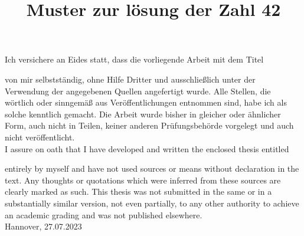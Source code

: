 \newpage
\title{Muster zur lösung der Zahl 42}
\newpage
{}%
\begin{flushleft}
Ich versichere an Eides statt, dass die vorliegende Arbeit mit dem Titel
\end{flushleft}
\begin{center}
\thetitle
\end{center}
\begin{flushleft}
von mir selbstständig, ohne Hilfe Dritter und ausschließlich unter der Verwendung der angegebenen Quellen angefertigt wurde. Alle Stellen, die wörtlich oder sinngemäß aus Veröffentlichungen entnommen sind, habe ich als solche kenntlich gemacht. Die Arbeit wurde bisher in gleicher oder ähnlicher Form, auch nicht in Teilen, keiner anderen Prüfungsbehörde vorgelegt und auch nicht veröffentlicht.\\
\vspace{0.5cm}
I assure on oath that I have developed and written the enclosed thesis entitled
\end{flushleft}
\begin{center}
\thetitle
\end{center}
\begin{flushleft}
entirely by myself and have not used sources or means without declaration in the text. Any thoughts or quotations which were inferred from these sources are clearly marked as such. This thesis was not submitted in the same or in a substantially similar version, not even partially, to any other authority to achieve an academic grading and was not published elsewhere.\\
\vspace{1cm}
Hannover, 27.07.2023\\
\vspace{1cm}
\theauthor
\end{flushleft}
\newpage